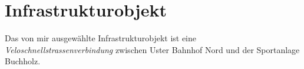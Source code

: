 %
%
%
%

\chapter{Infrastrukturobjekt}
\label{chap:Infrastruktur}



Das von mir ausgewählte Infrastrukturobjekt ist eine \textit{Veloschnellstrassenverbindung} zwischen Uster Bahnhof Nord und der Sportanlage Buchholz.




%


